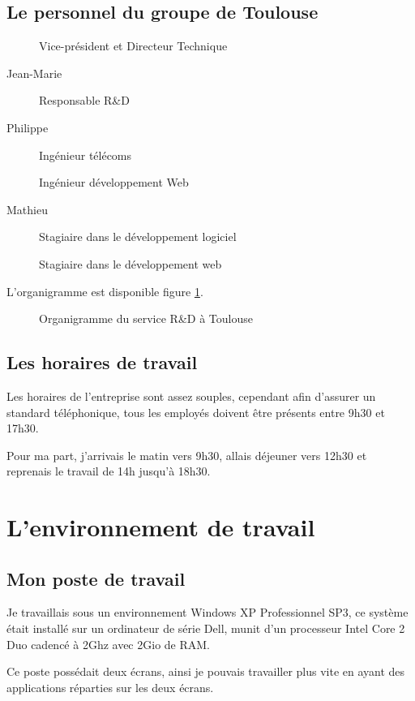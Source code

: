\newpage
	\subsection{Le personnel du groupe de Toulouse}
	\begin{description}
		\item[\Denis{}] Vice-président et Directeur Technique
		\item[Jean-Marie ] Responsable R\&D
		\item[Philippe ] Ingénieur télécoms
		\item[\Romain{}] Ingénieur développement Web
		\item[Mathieu ] Stagiaire dans le développement logiciel
		\item[\Adr{}] Stagiaire dans le développement web
	\end{description}
	L'organigramme est disponible figure \ref{organigramme}.
	\begin{figure}[H]
		\centering
		

		\caption{Organigramme du service R\&D à Toulouse}
		\label{organigramme}
	\end{figure}

	\subsection{Les horaires de travail}
        Les horaires de l'entreprise sont assez souples, cependant afin d'assurer un standard téléphonique, tous les employés doivent être présents entre 9h30 et 17h30.

        Pour ma part, j'arrivais le matin vers 9h30, allais déjeuner vers 12h30 et reprenais le travail de 14h jusqu'à 18h30.
	\section{L'environnement de travail}
    \subsection{Mon poste de travail}
        Je travaillais sous un environnement Windows XP Professionnel SP3, ce système était installé sur un ordinateur de série Dell, munit d'un processeur Intel Core 2 Duo cadencé à 2Ghz avec 2Gio de RAM.

        Ce poste possédait deux écrans, ainsi je pouvais travailler plus vite en ayant des applications réparties sur les deux écrans.
